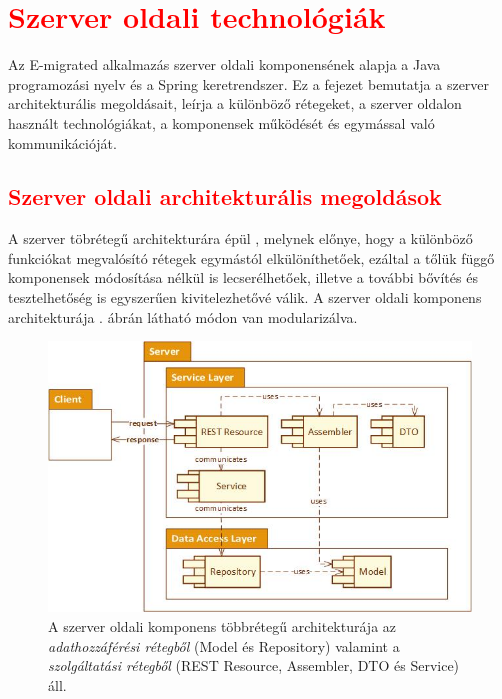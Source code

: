 \chapter{\textcolor{red}{Szerver oldali technológiák}}\label{ch:szerver}

\begin{osszefoglal}
Az E-migrated alkalmazás szerver oldali komponensének alapja a Java programozási nyelv és a Spring keretrendszer. Ez a fejezet bemutatja a szerver architekturális megoldásait, leírja a különböző rétegeket, a szerver oldalon használt technológiákat,  a komponensek működését és egymással való kommunikációját. 
\end{osszefoglal}

\section{\textcolor{red}{Szerver oldali architekturális megoldások}}
\label{sec:szerverArch}

A szerver töbrétegű architekturára épül \cite{MultitierArchitecture}, melynek előnye, hogy a különböző funkciókat megvalósító rétegek egymástól elkülöníthetőek, ezáltal a tőlük függő komponensek módosítása nélkül is lecserélhetőek, illetve a további bővítés és tesztelhetőség is egyszerűen kivitelezhetővé válik. A szerver oldali komponens architekturája . ábrán látható módon van modularizálva. 
\begin{figure}
  \centering
  \includegraphics[width=1\linewidth]{images/ServerArchitecture}
  \caption{A szerver oldali komponens többrétegű architekturája  az \textit{adathozzáférési rétegből} (Model és Repository) valamint a \textit{szolgáltatási rétegből} (REST Resource, Assembler, DTO és Service) áll.}
  \label{fig:ServerArchitecture}
\end{figure}

